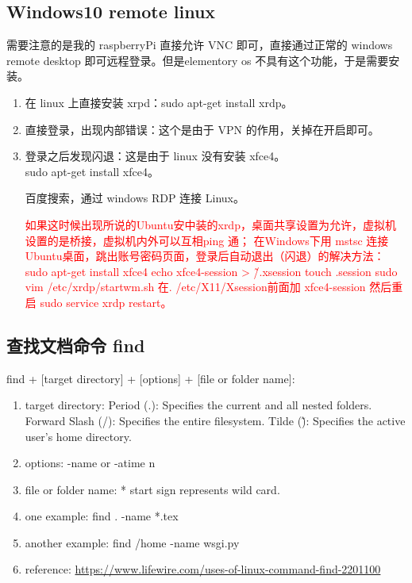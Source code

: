 \documentclass[UTF8,fancyhdr,a4paper]{ctexart}
\newcommand{\pflred}[1]{\textcolor{red}{#1}}
\begin{document}
\subsection{Windows10 remote linux}
需要注意的是我的 raspberryPi 直接允许 VNC 即可，直接通过正常的 windows remote desktop 即可远程登录。但是elementory os 不具有这个功能，于是需要安装。
\begin{enumerate}
      \item 在 linux 上直接安装 xrpd：sudo apt-get install xrdp。
      \item 直接登录，出现内部错误：这个是由于 VPN 的作用，关掉在开启即可。
      \item 登录之后发现闪退：这是由于 linux 没有安装 xfce4。\\ sudo apt-get install xfce4。\par
            百度搜索，通过 windows RDP 连接 Linux。

            \pflred{如果这时候出现所说的Ubuntu安中装的xrdp，桌面共享设置为允许，虚拟机设置的是桥接，虚拟机内外可以互相ping 通；
                  在Windows下用 mstsc 连接Ubuntu桌面，跳出账号密码页面，登录后自动退出（闪退）的解决方法：sudo apt-get install xfce4
                  echo xfce4-session > \~/.xsession
                  touch .session
                  sudo vim /etc/xrdp/startwm.sh
                  在. /etc/X11/Xsession前面加
                  xfce4-session
                  然后重启 sudo service xrdp restart。}


\end{enumerate}


\subsection{查找文档命令 find}

find + [target directory] + [options] + [file or folder name]:
\begin{enumerate}
      \item
            target directory:
            Period (.): Specifies the current and all nested folders.
            Forward Slash (/): Specifies the entire filesystem.
            Tilde (\~): Specifies the active user's home directory.
      \item
            options:
            -name or -atime n
      \item
            file or folder name:
            * start sign represents wild card.
      \item one example:
            find . -name *.tex
      \item another example:
            find /home -name wsgi.py
      \item
            reference:
            \url	{https://www.lifewire.com/uses-of-linux-command-find-2201100}


\end{enumerate}
\end{document}
